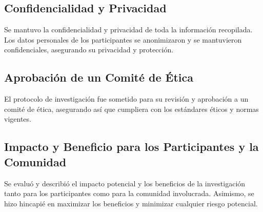 \documentclass[stu, 12pt]{apa7}
\begin{document}
	\subsection{Confidencialidad y Privacidad}\label{confidencialidad-y-privacidad}

	Se mantuvo la confidencialidad y privacidad de toda la información
	recopilada. Los datos personales de los participantes se anonimizaron y se
	mantuvieron confidenciales, asegurando su privacidad y
	protección.

	\subsection{Aprobación de un Comité de Ética}\label{aprobaciuxf3n-de-un-comituxe9-de-uxe9tica}

	El protocolo de investigación fue sometido para su revisión y
	aprobación a un comité de ética, asegurando así que cumpliera con los
	estándares éticos y normas vigentes.

	\subsection{Impacto y Beneficio para los Participantes y la Comunidad}\label{impacto-y-beneficio-para-los-participantes-y-la-comunidad}

	Se evaluó y describió el impacto potencial y los beneficios de la
	investigación tanto para los participantes como para la comunidad
	involucrada. Asimismo, se hizo hincapié en maximizar los beneficios y
	minimizar cualquier riesgo potencial.






\end{document}
